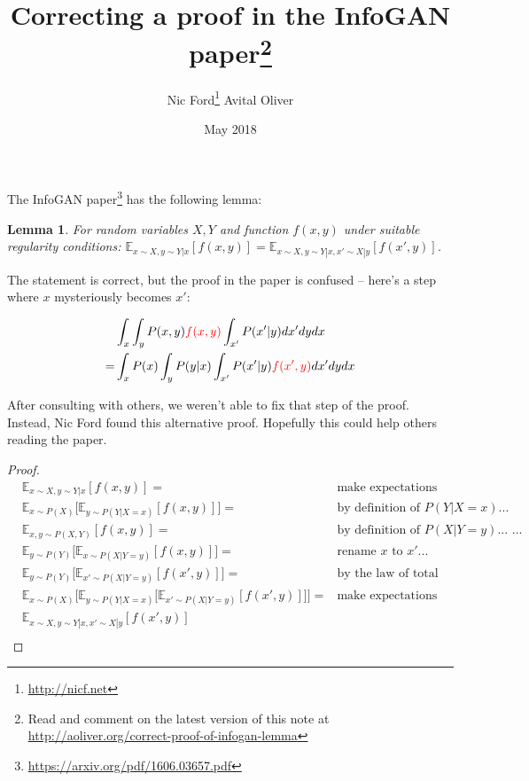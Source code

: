 \documentclass{article}
\title{Correcting a proof in the InfoGAN paper\footnote{Read and comment on the latest version of this note at \url{http://aoliver.org/correct-proof-of-infogan-lemma}}
}
\author{Nic Ford\footnote{\url{http://nicf.net}} \cr Avital Oliver}
\date{May 2018}
\newtheorem{lemma}[theorem]{Lemma}
\begin{document}
\maketitle


The
InfoGAN paper\footnote{\url{https://arxiv.org/pdf/1606.03657.pdf}} %
has the following lemma:

\setcounter{section}{5} %

\begin{lemma}
For random variables $X, Y$ and function $f(x, y)$ under suitable regularity conditions:
$\mathbb{E}_{x \sim X, y \sim Y|x}[f(x, y)] = 
 \mathbb{E}_{x \sim X, y \sim Y|x, x' \sim X|y}[f(x', y)]$.
\end{lemma}

The statement is correct, but the proof in the paper is confused -- here's a step where $x$ mysteriously becomes $x'$:


\begin{align*}
& \int_x \int_y P(x,y) {\color{red}{f(x,y)}} \int_{x'} P(x' | y)dx'dydx \\
= & \int_x P(x) \int_y P(y|x) \int_{x'} P(x'|y) {\color{red}{f(x',y)}} dx' dy dx
\end{align*}

After consulting with others, we weren't able to fix that step of the proof. Instead, Nic Ford found this alternative proof. Hopefully this could help others reading the paper.

\begin{proof}
\begin{align*}
   & \mathbb{E}_{x \sim X,y \sim Y|x}[f(x, y)] = & \mbox{make expectations explicit...} \\
   & \mathbb{E}_{x \sim P(X)}\big[\mathbb{E}_{y \sim P(Y|X=x)}[f(x, y)]\big] = & \mbox{by definition of $P(Y|X=x)$...} \\
   & \mathbb{E}_{x,y \sim P(X,Y)}[f(x, y)] = & \mbox{by definition of $P(X|Y=y)$... ...} \\
   & \mathbb{E}_{y \sim P(Y)}\big[\mathbb{E}_{x \sim P(X|Y=y)}[f(x, y)]\big] = & \mbox{rename $x$ to $x'$...} \\
   & \mathbb{E}_{y \sim P(Y)}\big[\mathbb{E}_{x' \sim P(X|Y=y)}[f(x', y)]\big] = & \mbox{by the law of total expectation...} \\
   & \mathbb{E}_{x \sim P(X)}\Big[\mathbb{E}_{y \sim P(Y|X=x)}\big[\mathbb{E}_{x' \sim P(X|Y=y)}[f(x', y)]\big]\Big] = &  \mbox{make expectations implicit...} \\
   & \mathbb{E}_{x \sim X,y \sim Y|x,x' \sim X|y}[f(x', y)] & \\
\end{align*}
\end{proof}

\end{document}
